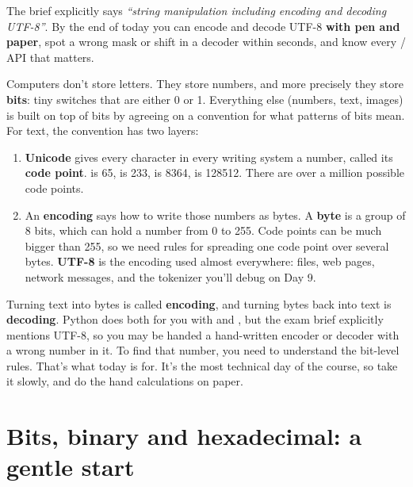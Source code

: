 \documentclass[10pt,a4paper]{article}
\begin{document}
\makecover
\setcounter{page}{2}
\makefrontmatter
\begin{goalbox}
The brief explicitly says \emph{“string manipulation including encoding and decoding UTF-8”}. By the end of today you can encode and decode UTF-8 \textbf{with pen and paper}, spot a wrong mask or shift in a decoder within seconds, and know every / API that matters.
\end{goalbox}
\vspace{2pt}
Computers don’t store letters. They store numbers, and more precisely they store \textbf{bits}: tiny switches that are either 0 or 1. Everything else (numbers, text, images) is built on top of bits by agreeing on a convention for what patterns of bits mean.
For text, the convention has two layers:
\begin{enumerate}
\item \textbf{Unicode} gives every character in every writing system a number, called its \textbf{code point}.  is 65,  is 233,  is 8364, \code{\smiley{}} is 128512. There are over a million possible code points.
\item An \textbf{encoding} says how to write those numbers as bytes. A \textbf{byte} is a group of 8 bits, which can hold a number from 0 to 255. Code points can be much bigger than 255, so we need rules for spreading one code point over several bytes. \textbf{UTF-8} is the encoding used almost everywhere: files, web pages, network messages, and the tokenizer you’ll debug on Day 9.
\end{enumerate}
Turning text into bytes is called \textbf{encoding}, and turning bytes back into text is \textbf{decoding}. Python does both for you with  and , but the exam brief explicitly mentions UTF-8, so you may be handed a hand-written encoder or decoder with a wrong number in it. To find that number, you need to understand the bit-level rules. That’s what today is for. It’s the most technical day of the course, so take it slowly, and do the hand calculations on paper.
\setcounter{section}{0}
\section{Bits, binary and hexadecimal: a gentle start}
\end{document}
